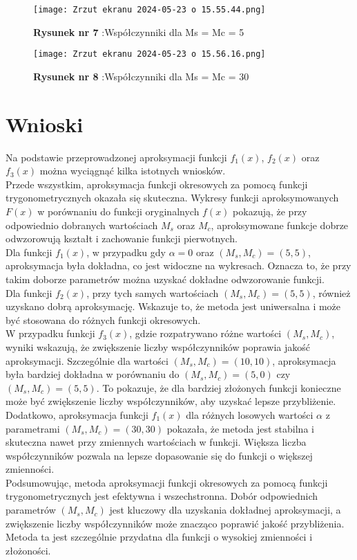 \documentclass{article}
\begin{document}
\begin{figure}[H]
    \centering
    \texttt{[image: Zrzut ekranu 2024-05-23 o 15.55.44.png]}
    \caption{\textbf{Rysunek nr 7} :Współczynniki dla Ms = Mc = 5}
    \label{fig:enter-label}
\end{figure}

\begin{figure}[H]
    \centering
    \texttt{[image: Zrzut ekranu 2024-05-23 o 15.56.16.png]}
    \caption{\textbf{Rysunek nr 8} :Współczynniki dla Ms = Mc = 30}
    \label{fig:enter-label}
\end{figure}

\newpage
\section{Wnioski}

Na podstawie przeprowadzonej aproksymacji funkcji $f_1(x)$, $f_2(x)$ oraz $f_3(x)$ można wyciągnąć kilka istotnych wniosków.\\
Przede wszystkim, aproksymacja funkcji okresowych za pomocą funkcji trygonometrycznych okazała się skuteczna. Wykresy funkcji aproksymowanych $F(x)$ w porównaniu do funkcji oryginalnych $f(x)$ pokazują, że przy odpowiednio dobranych wartościach $M_s$ oraz $M_c$, aproksymowane funkcje dobrze odwzorowują kształt i zachowanie funkcji pierwotnych.\\
Dla funkcji $f_1(x)$, w przypadku gdy $\alpha = 0$ oraz $(M_s, M_c) = (5, 5)$, aproksymacja była dokładna, co jest widoczne na wykresach. Oznacza to, że przy takim doborze parametrów można uzyskać dokładne odwzorowanie funkcji.\\
Dla funkcji $f_2(x)$, przy tych samych wartościach $(M_s, M_c) = (5, 5)$, również uzyskano dobrą aproksymację. Wskazuje to, że metoda jest uniwersalna i może być stosowana do różnych funkcji okresowych.\\
W przypadku funkcji $f_3(x)$, gdzie rozpatrywano różne wartości $(M_s, M_c)$, wyniki wskazują, że zwiększenie liczby współczynników poprawia jakość aproksymacji. Szczególnie dla wartości $(M_s, M_c) = (10, 10)$, aproksymacja była bardziej dokładna w porównaniu do $(M_s, M_c) = (5, 0)$ czy $(M_s, M_c) = (5, 5)$. To pokazuje, że dla bardziej złożonych funkcji konieczne może być zwiększenie liczby współczynników, aby uzyskać lepsze przybliżenie.\\
Dodatkowo, aproksymacja funkcji $f_1(x)$ dla różnych losowych wartości $\alpha$ z parametrami $(M_s, M_c) = (30, 30)$ pokazała, że metoda jest stabilna i skuteczna nawet przy zmiennych wartościach w funkcji. Większa liczba współczynników pozwala na lepsze dopasowanie się do funkcji o większej zmienności.\\
Podsumowując, metoda aproksymacji funkcji okresowych za pomocą funkcji trygonometrycznych jest efektywna i wszechstronna. Dobór odpowiednich parametrów $(M_s, M_c)$ jest kluczowy dla uzyskania dokładnej aproksymacji, a zwiększenie liczby współczynników może znacząco poprawić jakość przybliżenia. Metoda ta jest szczególnie przydatna dla funkcji o wysokiej zmienności i złożoności.
\end{document}
